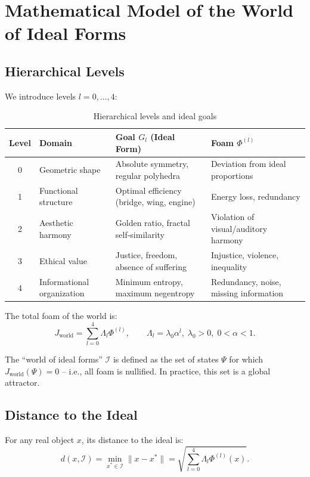 \documentclass[12pt,a4paper]{article}
\begin{document}
\section{Mathematical Model of the World of Ideal Forms}

\subsection{Hierarchical Levels}

We introduce levels \(l = 0,\dots,4\):

\begin{table}[h]
\centering
\caption{Hierarchical levels and ideal goals}
\label{tab:levels}
\begin{tabular}{|c|l|l|p{6cm}|}
\hline
Level & Domain & Goal \(G_l\) (Ideal Form) & Foam \(\Phi^{(l)}\) \\
\hline
0 & Geometric shape & Absolute symmetry, regular polyhedra & Deviation from ideal proportions \\
1 & Functional structure & Optimal efficiency (bridge, wing, engine) & Energy loss, redundancy \\
2 & Aesthetic harmony & Golden ratio, fractal self‑similarity & Violation of visual/auditory harmony \\
3 & Ethical value & Justice, freedom, absence of suffering & Injustice, violence, inequality \\
4 & Informational organization & Minimum entropy, maximum negentropy & Redundancy, noise, missing information \\
\hline
\end{tabular}
\end{table}

The total foam of the world is:
\[
J_{\text{world}} = \sum_{l=0}^{4} \Lambda_l \Phi^{(l)}, \qquad \Lambda_l = \lambda_0 \alpha^l,\; \lambda_0>0,\;0<\alpha<1.
\]

The “world of ideal forms” \(\mathcal{I}\) is defined as the set of states \(\Psi\) for which \(J_{\text{world}}(\Psi) = 0\) – i.e., all foam is nullified. In practice, this set is a global attractor.

\subsection{Distance to the Ideal}

For any real object \(x\), its distance to the ideal is:
\[
d(x, \mathcal{I}) = \min_{x^* \in \mathcal{I}} \|x - x^*\| = \sqrt{ \sum_{l=0}^{4} \Lambda_l \Phi^{(l)}(x) }.
\]
\end{document}
